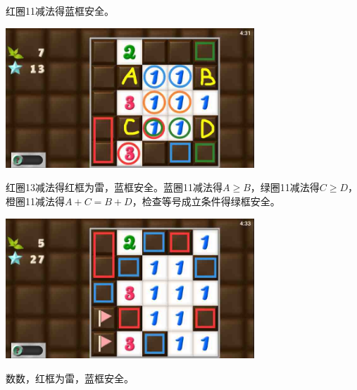 红圈11减法得蓝框安全。
\begin{center}
    \includegraphics[width=0.7\textwidth]{puzzlelow/209-5.jpg}
\end{center}
红圈13减法得红框为雷，蓝框安全。蓝圈11减法得$A\ge B$，绿圈11减法得$C\ge D$，橙圈11减法得$A+C=B+D$，检查等号成立条件得绿框安全。
\begin{center}
    \includegraphics[width=0.7\textwidth]{puzzlelow/209-6.jpg}
\end{center}
数数，红框为雷，蓝框安全。

